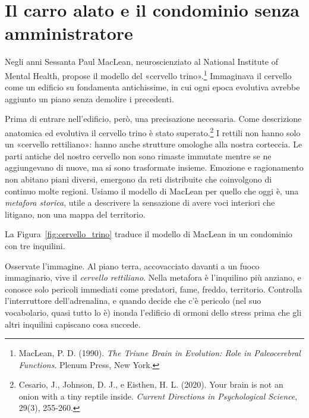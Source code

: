 \section{Il carro alato e il condominio senza amministratore}
\label{sec:p1c1-carro-alato}

Negli anni Sessanta Paul MacLean, neuroscienziato al National Institute of Mental Health, propose il modello del «cervello trino».\footnote{MacLean, P. D. (1990). \textit{The Triune Brain in Evolution: Role in Paleocerebral Functions}. Plenum Press, New York.} Immaginava il cervello come un edificio su fondamenta antichissime, in cui ogni epoca evolutiva avrebbe aggiunto un piano senza demolire i precedenti.

Prima di entrare nell'edificio, però, una precisazione necessaria. Come descrizione anatomica ed evolutiva il cervello trino è stato superato.\footnote{Cesario, J., Johnson, D. J., e Eisthen, H. L. (2020). Your brain is not an onion with a tiny reptile inside. \textit{Current Directions in Psychological Science}, 29(3), 255-260.} I rettili non hanno solo un «cervello rettiliano»: hanno anche strutture omologhe alla nostra corteccia. Le parti antiche del nostro cervello non sono rimaste immutate mentre se ne aggiungevano di nuove, ma si sono trasformate insieme. Emozione e ragionamento non abitano piani diversi, emergono da reti distribuite che coinvolgono di continuo molte regioni. Usiamo il modello di MacLean per quello che oggi è, una \textit{metafora storica}, utile a descrivere la sensazione di avere voci interiori che litigano, non una mappa del territorio.

La Figura~\ref{fig:cervello_trino} traduce il modello di MacLean in un condominio con tre inquilini.


Osservate l'immagine. Al piano terra, accovacciato davanti a un fuoco immaginario, vive il \textit{cervello rettiliano}. Nella metafora è l'inquilino più anziano, e conosce solo pericoli immediati come predatori, fame, freddo, territorio. Controlla l'interruttore dell'adrenalina, e quando decide che c'è pericolo (nel suo vocabolario, quasi tutto lo è) inonda l'edificio di ormoni dello stress prima che gli altri inquilini capiscano cosa succede.

